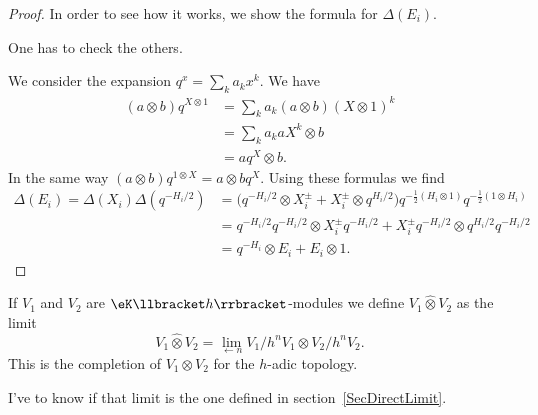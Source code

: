 \begin{proof}
	In order to see how it works, we show the formula for \( \Delta(E_i)\).
	\begin{probleme}
		One has to check the others.
	\end{probleme}
	We consider the expansion \( q^{x}=\sum_ka_kx^k\). We have
	\begin{subequations}
		\begin{align}
			(a\otimes b)q^{X\otimes 1} & =\sum_ka_k(a\otimes b)(X\otimes 1)^k \\
			                           & =\sum_k a_k aX^k\otimes b            \\
			                           & =aq^X\otimes b.
		\end{align}
	\end{subequations}
	In the same way \( (a\otimes b)q^{1\otimes X}=a\otimes bq^{X}\). Using these formulas we find
	\begin{subequations}
		\begin{align}
			\Delta(E_i)=\Delta(X_i)\Delta(q^{-H_i/2}) & =\big( q^{-H_i/2}\otimes X_i^{\pm}+X_i^{\pm}\otimes q^{H_i/2} \big)q^{-\frac{ 1 }{2}(H_i\otimes 1)}q^{-\frac{ 1 }{2}(1\otimes H_i)} \\
			                                          & =q^{-H_i/2}q^{-H_i/2}\otimes X_i^{\pm}q^{-H_i/2}+X_i^{\pm}q^{-H_i/2}\otimes q^{H_i/2}q^{-H_i/2}                                     \\
			                                          & =q^{-H_i}\otimes E_i+E_i\otimes 1.
		\end{align}
	\end{subequations}
\end{proof}

If \( V_1\) and \( V_2\) are \( \eK\llbracket h\rrbracket\)-modules we define \( V_1\hat\otimes V_2\) as the limit
\begin{equation}
	V_1\hat\otimes V_2=\lim_{\leftarrow n}V_1/h^n V_1\otimes V_2/h^nV_2.
\end{equation}
This is the completion of \( V_1\otimes V_2\) for the \( h\)-adic topology.

\begin{probleme}
	I've to know if that limit is the one defined in section~\ref{SecDirectLimit}.
\end{probleme}


